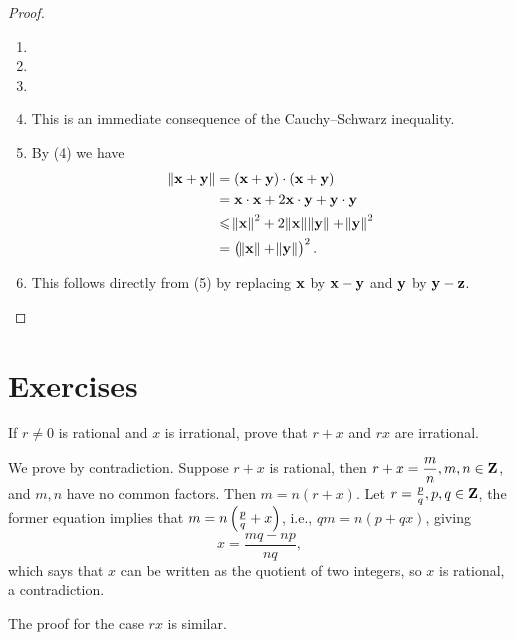 \begin{proof} \
\begin{enumerate}[label=(\roman*)]
\item 
\item 
\item 
\item This is an immediate consequence of the Cauchy--Schwarz inequality.
\item By (4) we have
\begin{align*}
\norm{\vb{x}+\vb{y}}&=(\vb{x}+\vb{y})\cdot(\vb{x}+\vb{y})\\
&=\vb{x}\cdot\vb{x}+2\vb{x}\cdot\vb{y}+\vb{y}\cdot\vb{y}\\
&\leqslant\norm{\vb{x}}^2+2\norm{\vb{x}}\norm{\vb{y}}+\norm{\vb{y}}^2\\
&=\left(\norm{\vb{x}}+\norm{\vb{y}}\right)^2.
\end{align*}
\item This follows directly from (5) by replacing $\vb{x}$ by $\vb{x}-\vb{y}$ and $\vb{y}$ by $\vb{y}-\vb{z}$.
\end{enumerate}
\end{proof}

\begin{comment}
\begin{definition}
The \vocab{distance between sets} $E\subset\RR^n$ and $F\subset\RR^n$ is defined as
\[ d(E,F)\coloneqq\inf_{x\in E,y\in F}\norm{x-y}. \]
\end{definition}

Obviously $d(E,F)>0$ implies that $E$ and $F$ are disjoint, but $E$ and $F$ may still be disjoint even if $d(E,F)=0$. For example, the closed intervals $E=(-1,0)$ and $F=(0,1)$.

\begin{exercise}
Suppose that $E$ and $F$ are sets in $\RR^n$ where $E$ and $F$ is finite. Prove that $E$ and $F$ are disjoint if and only if $d(E,F)>0$.
\end{exercise}
\end{comment}
\pagebreak

\section*{Exercises}
\begin{prbm}
If $r\neq0$ is rational and $x$ is irrational, prove that $r+x$ and $rx$ are irrational.
\end{prbm}

\begin{solution}
We prove by contradiction. Suppose $r+x$ is rational, then $r+x=\dfrac{m}{n},m,n\in\mathbf Z$, and $m,n$ have no common factors. Then $m=n(r+x)$. Let $r=\frac{p}{q},p,q\in\mathbf Z$, the former equation implies that $m=n\left(\frac{p}{q}+x\right)$, i.e., $qm=n(p+qx)$, giving
\[x=\frac{mq-np}{nq},\]
which says that $x$ can be written as the quotient of two integers, so $x$ is rational, a contradiction.

The proof for the case $rx$ is similar.
\end{solution}


